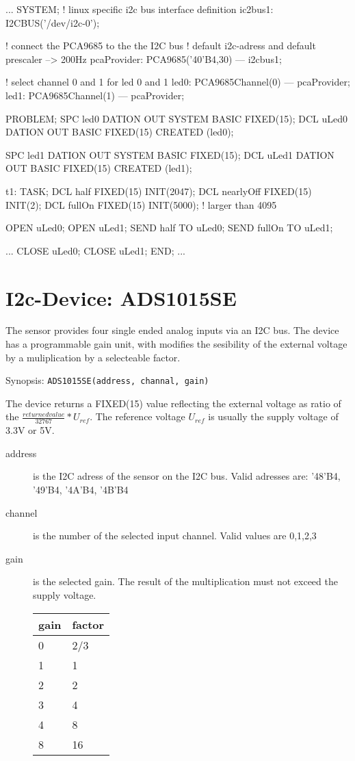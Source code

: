 \begin{PEARLCode}
...
SYSTEM;
   ! linux specific i2c bus interface definition
   ic2bus1: I2CBUS('/dev/i2c-0');

   ! connect the PCA9685 to the the I2C bus
   ! default i2c-adress and default prescaler --> 200Hz
   pcaProvider: PCA9685('40'B4,30) --- i2cbus1;

   ! select channel 0 and 1 for led 0 and 1
   led0: PCA9685Channel(0) --- pcaProvider;
   led1: PCA9685Channel(1) --- pcaProvider;


PROBLEM;
   SPC led0 DATION OUT SYSTEM BASIC FIXED(15);
   DCL uLed0 DATION OUT BASIC FIXED(15) CREATED (led0);

   SPC led1 DATION OUT SYSTEM BASIC FIXED(15);
   DCL uLed1 DATION OUT BASIC FIXED(15) CREATED (led1);

t1: TASK;
   DCL half FIXED(15) INIT(2047);
   DCL nearlyOff FIXED(15) INIT(2);
   DCL fullOn FIXED(15) INIT(5000); ! larger than 4095

   OPEN uLed0;
   OPEN uLed1;
   SEND half   TO uLed0;  
   SEND fullOn TO uLed1;  

...
   CLOSE uLed0;
   CLOSE uLed1;
END;
...
\end{PEARLCode}

\section{I2c-Device: ADS1015SE}
The sensor provides four single ended analog inputs via an I2C bus.
The device  has a programmable gain unit, with modifies the sesibility
of the external voltage by a muliplication by a selecteable factor.

Synopsis: \texttt{ADS1015SE(address, channal, gain)}

The device returns a FIXED(15) value reflecting the external voltage as ratio
of the $\frac{returned value}{32767}*U_{ref}$.
The reference voltage $U_{ref}$ is usually the supply voltage of 3.3V or 5V.

\begin{description}
\item[address] is the I2C adress of the sensor on the I2C bus.
   Valid adresses are: '48'B4, '49'B4, '4A'B4, '4B'B4
\item[channel] is the number of the selected input channel. 
   Valid values are 0,1,2,3
\item[gain] is the selected gain.
   The result of the multiplication must not exceed the supply voltage.

  \begin{tabular}{l|l}
   gain & factor\\
   \hline 
   0 & 2/3 \\
   1 & 1 \\
   2 & 2 \\
   3 & 4 \\
   4 & 8 \\
   8 & 16 \\
   \end{tabular} 

\end{description}

